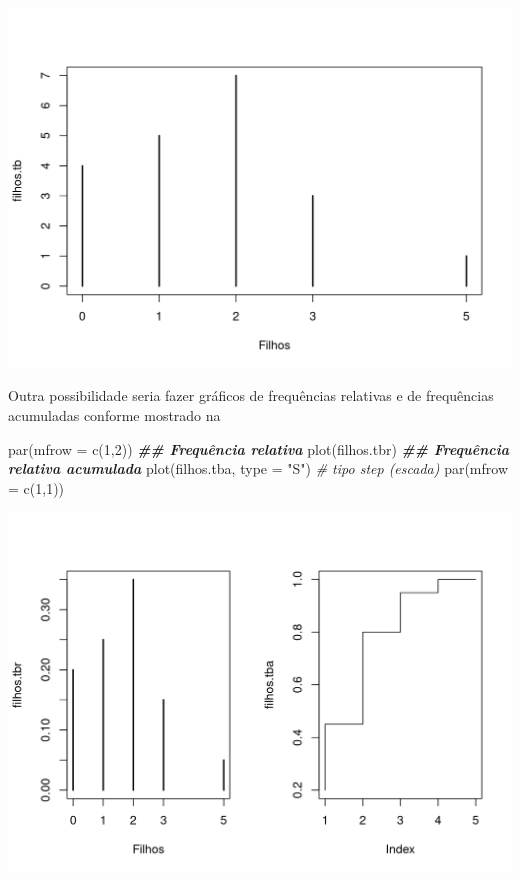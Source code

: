 \documentclass[
  10pt,
  a4paper]{book}
\newenvironment{Shaded}{\begin{snugshade}}{\end{snugshade}}
\newcommand{\AttributeTok}[1]{\textcolor[rgb]{0.77,0.63,0.00}{#1}}
\newcommand{\CommentTok}[1]{\textcolor[rgb]{0.56,0.35,0.01}{\textit{#1}}}
\newcommand{\DecValTok}[1]{\textcolor[rgb]{0.00,0.00,0.81}{#1}}
\newcommand{\DocumentationTok}[1]{\textcolor[rgb]{0.56,0.35,0.01}{\textbf{\textit{#1}}}}
\newcommand{\FunctionTok}[1]{\textcolor[rgb]{0.00,0.00,0.00}{#1}}
\newcommand{\NormalTok}[1]{#1}
\newcommand{\StringTok}[1]{\textcolor[rgb]{0.31,0.60,0.02}{#1}}
\begin{document}
\begin{center}\includegraphics{figures/unnamed-chunk-302-1} \end{center}

Outra possibilidade seria fazer gráficos de frequências relativas e de
frequências acumuladas conforme mostrado na

\begin{Shaded}
\begin{Highlighting}[]
\FunctionTok{par}\NormalTok{(}\AttributeTok{mfrow =} \FunctionTok{c}\NormalTok{(}\DecValTok{1}\NormalTok{,}\DecValTok{2}\NormalTok{))}
\DocumentationTok{\#\# Frequência relativa}
\FunctionTok{plot}\NormalTok{(filhos.tbr)}
\DocumentationTok{\#\# Frequência relativa acumulada}
\FunctionTok{plot}\NormalTok{(filhos.tba, }\AttributeTok{type =} \StringTok{"S"}\NormalTok{) }\CommentTok{\# tipo step (escada)}
\FunctionTok{par}\NormalTok{(}\AttributeTok{mfrow =} \FunctionTok{c}\NormalTok{(}\DecValTok{1}\NormalTok{,}\DecValTok{1}\NormalTok{))}
\end{Highlighting}
\end{Shaded}

\begin{center}\includegraphics{figures/unnamed-chunk-303-1} \end{center}
\end{document}

